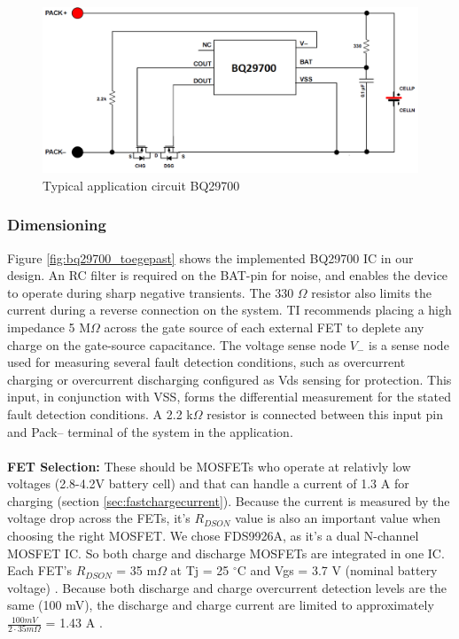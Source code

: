 \documentclass[11pt,a4paper]{article}
\begin{document}
\begin{figure}[H]
	\centering
	\includegraphics[width=0.9\linewidth]{bq29700_principeschema.png}
	\caption{Typical application circuit BQ29700 \cite{bib:BQ29700}}
	\label{fig:bq29700_principeschema}
\end{figure}

\subsubsection{Dimensioning}
Figure \ref{fig:bq29700_toegepast} shows the implemented BQ29700 IC in our design. An RC filter is required on the BAT-pin for noise, and enables the device to operate during sharp negative transients. The 330 $\Omega$ resistor also limits the current during a reverse connection on the system. TI recommends placing a high impedance 5 M$\Omega$ across the gate source of each external FET to deplete any charge on the gate-source capacitance. The voltage sense node $V_-$ is a sense node used for measuring several fault detection conditions, such as overcurrent charging or
overcurrent discharging configured as Vds sensing for protection. This input, in conjunction with VSS, forms the differential measurement for the stated fault detection conditions. A 2.2 k$\Omega$ resistor is connected between this input pin and Pack– terminal of the system in the application.
\\ \\
\textbf{FET Selection:} These should be MOSFETs who operate at relativly low voltages (2.8-4.2V battery cell) and that can handle a current of 1.3 A for charging (section \ref{sec:fastchargecurrent}). Because the current is measured by the voltage drop across the FETs, it's $R_{DSON}$ value is also an important value when choosing the right MOSFET. We chose FDS9926A, as it's a dual N-channel MOSFET IC. So both charge and discharge MOSFETs are integrated in one IC. Each FET's $R_{DSON}$ = 35 m$\Omega$ at Tj = 25 $^\circ$C and Vgs = 3.7 V (nominal battery voltage) \cite{bib:FDS9926A}. Because both discharge and charge overcurrent detection levels are the same (100 mV), the discharge and charge current are limited to approximately $\frac{100 mV}{2 \cdot 35m\Omega}$ = 1.43 A \cite{bib:BQ29700, bib:FDS9926A}.
\end{document}
